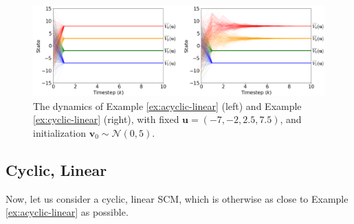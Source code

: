 \documentclass[letterpaper,10pt]{article}
\begin{document}
\begin{figure}
\centering
\includegraphics[width=\linewidth]{pics/my_own/example_dynamics.png}
\caption{The dynamics of Example \ref{ex:acyclic-linear} (left) and Example \ref{ex:cyclic-linear} (right), with fixed $\mathbf{u}=(-7,-2,2.5,7.5)$, and initialization $\mathbf{v}_0\sim\mathcal{N}(0,5)$.}
\label{fig:dynamics}
\end{figure}

\subsection{Cyclic, Linear}

Now, let us consider a cyclic, linear SCM, which is otherwise as close to Example \ref{ex:acyclic-linear} as possible.
\end{document}

